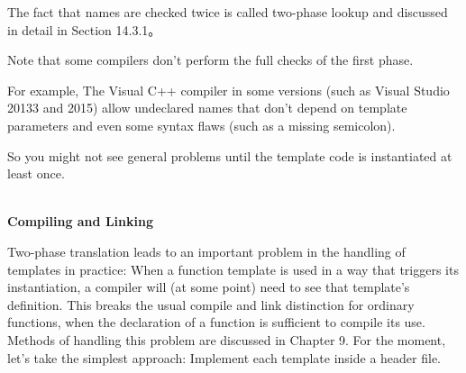 The fact that names are checked twice is called two-phase lookup and discussed in detail in Section 14.3.1。

Note that some compilers don’t perform the full checks of the first phase.

\begin{tcolorbox}[colback=webgreen!5!white,colframe=webgreen!75!black]
\hspace*{0.75cm}For example, The Visual C++ compiler in some versions (such as Visual Studio 20133 and 2015) allow undeclared names that don’t depend on template parameters and even some syntax flaws (such as a missing semicolon).
\end{tcolorbox}

So you might not see general problems until the template code is instantiated at least once.

\hspace*{\fill} \\ %
\noindent
\textbf{Compiling and Linking}

Two-phase translation leads to an important problem in the handling of templates in practice: When a function template is used in a way that triggers its instantiation, a compiler will (at some point) need to see that template’s definition. This breaks the usual compile and link distinction for ordinary functions, when the declaration of a function is sufficient to compile its use. Methods of handling this problem are discussed in Chapter 9. For the moment, let’s take the simplest approach: Implement each template inside a header file.








